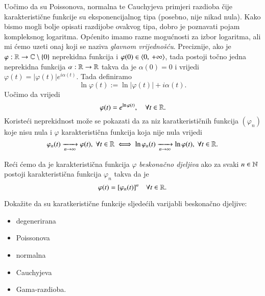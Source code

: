 Uo\v cimo da su Poissonova, normalna te Cauchyjeva primjeri razdioba \v cije karakteristi\v cne funkcije su eksponencijalnog tipa (posebno, nije nikad nula).
Kako bismo mogli bolje opisati razdijobe ovakvog tipa, dobro je poznavati pojam kompleksnog logaritma.
Op\' cenito imamo razne mogu\' cnosti za izbor logaritma, ali mi \' cemo uzeti onaj koji se naziva \emph{glavnom vrijedno\v s\' cu}.
Preciznije, ako je $\varphi : \mathbb{R} \to \mathbb{C} \setminus \{0\}$ neprekidna funkcija i $\varphi (0) \in \langle {0}, \: {+ \infty} \rangle$, tada postoji to\v cno jedna neprekidna funkcija $\alpha : \mathbb{R} \to \mathbb{R}$ takva da je $\alpha (0) = 0$ i vrijedi $\varphi (t) = | \varphi (t) | e^{i \alpha (t)}$.
Tada definiramo
\begin{equation}    \label{jed:17.19}
    \ln \varphi (t) := \ln | \varphi (t) | + i \alpha (t).
\end{equation}
Uo\v cimo da vrijedi
\begin{equation}    \label{jed:17.20}
    \varphi (t) = e^{\ln \varphi (t)}, \quad \forall t \in \mathbb{R}.
\end{equation}
Koriste\' ci neprekidnost mo\v ze se pokazati da za niz karatkeristi\v cnih funkcija $(\varphi_n)$ koje nisu nula i $\varphi$ karakteristi\v cna funkcija koja nije nula vrijedi
\begin{equation}    \label{jed:17.21}
    \varphi_n (t) \xrightarrow[n \to \infty]{} \varphi (t), \; \forall t \in \mathbb{R} \iff \ln \varphi_n (t) \xrightarrow[n \to \infty]{} \ln \varphi (t), \; \forall t \in \mathbb{R}.
\end{equation}

\begin{defn}    \label{defn:17.22}
    Re\' ci \' cemo da je karakteristi\v cna funkcija $\varphi$ \emph{beskona\v cno djeljiva} ako za svaki $n \in \mathbb{N}$ postoji karakteristi\v cna funkcija $\varphi_n$ takva da je
    \begin{equation*}
        \varphi (t) = [\varphi_n (t)]^n \quad \forall t \in \mathbb{R}.
    \end{equation*}
\end{defn}

\begin{zad} \label{zad:17.23}
    Doka\v zite da su karatkeristi\v cne funkcije sljede\' cih varijabli beskona\v cno djeljive:
    \begin{itemize}
        \item degenerirana
        \item Poissonova
        \item normalna
        \item Cauchyjeva
        \item Gama-razdioba.
    \end{itemize}
\end{zad}


